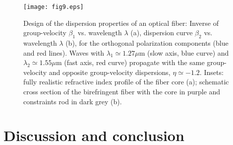 \documentclass[pra,twocolumn,showpacs,preprintnumbers,amsmath,amssymb]{revtex4}
\begin{document}
\begin{center}
\begin{figure}[t]
\texttt{[image: fig9.eps]}
\caption{Design of the dispersion properties of an optical fiber: Inverse of group-velocity $\beta_1$ vs. wavelength $\lambda$ (a), dispersion curve $\beta_2$ vs. wavelength $\lambda$ (b), for the orthogonal polarization components (blue and red lines).
Waves with $\lambda_1 \simeq 1.27 \mu$m (slow axis, blue curve) and $\lambda_2 \simeq 1.55 \mu$m (fast axis, red curve) propagate with the same group-velocity and opposite group-velocity dispersions, $\eta \simeq -1.2$.
Insets: fully realistic refractive index profile of the fiber core (a); schematic cross section of the birefringent fiber with the core in purple and constraints rod in dark grey (b).
}
\label{fig:exp}
\end{figure}
\end{center}




\section{Discussion and conclusion}
\end{document}

